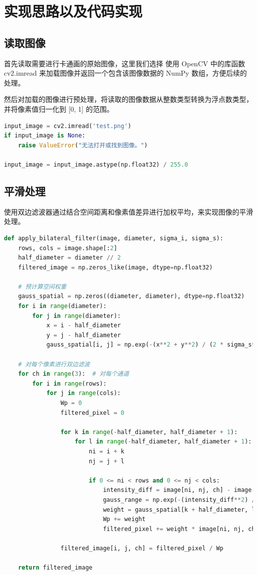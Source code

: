 \documentclass[a4paper,12pt]{report}
\begin{document}
\section{实现思路以及代码实现}
\subsection{读取图像}
首先读取需要进行卡通画的原始图像，这里我们选择 使用 OpenCV 中的库函数 cv2.imread 来加载图像并返回一个包含该图像数据的 NumPy 数组，方便后续的处理。

然后对加载的图像进行预处理，将读取的图像数据从整数类型转换为浮点数类型，并将像素值归一化到 [0, 1] 的范围。
\begin{lstlisting}[language=Python]
input_image = cv2.imread('test.png')
if input_image is None:
    raise ValueError("无法打开或找到图像。")

input_image = input_image.astype(np.float32) / 255.0 
\end{lstlisting}

\subsection{平滑处理}
使用双边滤波器通过结合空间距离和像素值差异进行加权平均，来实现图像的平滑处理。

\begin{lstlisting}[language=Python]
def apply_bilateral_filter(image, diameter, sigma_i, sigma_s):
    rows, cols = image.shape[:2]
    half_diameter = diameter // 2
    filtered_image = np.zeros_like(image, dtype=np.float32)

    # 预计算空间权重
    gauss_spatial = np.zeros((diameter, diameter), dtype=np.float32)
    for i in range(diameter):
        for j in range(diameter):
            x = i - half_diameter
            y = j - half_diameter
            gauss_spatial[i, j] = np.exp(-(x**2 + y**2) / (2 * sigma_s**2))

    # 对每个像素进行双边滤波
    for ch in range(3):  # 对每个通道
        for i in range(rows):
            for j in range(cols):
                Wp = 0
                filtered_pixel = 0

                for k in range(-half_diameter, half_diameter + 1):
                    for l in range(-half_diameter, half_diameter + 1):
                        ni = i + k
                        nj = j + l

                        if 0 <= ni < rows and 0 <= nj < cols:
                            intensity_diff = image[ni, nj, ch] - image[i, j, ch]
                            gauss_range = np.exp(-(intensity_diff**2) / (2 * sigma_i**2))
                            weight = gauss_spatial[k + half_diameter, l + half_diameter] * gauss_range
                            Wp += weight
                            filtered_pixel += weight * image[ni, nj, ch]

                filtered_image[i, j, ch] = filtered_pixel / Wp

    return filtered_image
\end{lstlisting}
\end{document}
